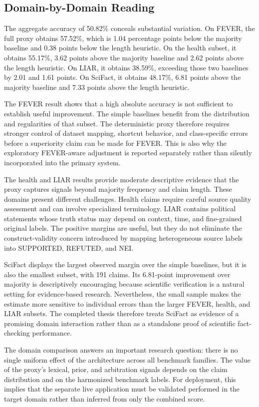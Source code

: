 \documentclass[12pt,a4paper,openany]{report}
\begin{document}
\subsection{Domain-by-Domain Reading}
The aggregate accuracy of 50.82\% conceals substantial variation. On FEVER,
the full proxy obtains 57.52\%, which is 1.04 percentage points below the
majority baseline and 0.38 points below the length heuristic. On the health
subset, it obtains 55.17\%, 3.62 points above the majority baseline and 2.62
points above the length heuristic. On LIAR, it obtains 38.59\%, exceeding
those two baselines by 2.01 and 1.61 points. On SciFact, it obtains 48.17\%,
6.81 points above the majority baseline and 7.33 points above the length
heuristic.

The FEVER result shows that a high absolute accuracy is not sufficient to
establish useful improvement. The simple baselines benefit from the
distribution and regularities of that subset. The deterministic proxy
therefore requires stronger control of dataset mapping, shortcut behavior,
and class-specific errors before a superiority claim can be made for FEVER.
This is also why the exploratory FEVER-aware adjustment is reported
separately rather than silently incorporated into the primary system.

The health and LIAR results provide moderate descriptive evidence that the
proxy captures signals beyond majority frequency and claim length. These
domains present different challenges. Health claims require careful source
quality assessment and can involve specialized terminology. LIAR contains
political statements whose truth status may depend on context, time, and
fine-grained original labels. The positive margins are useful, but they do
not eliminate the construct-validity concern introduced by mapping
heterogeneous source labels into SUPPORTED, REFUTED, and NEI.

SciFact displays the largest observed margin over the simple baselines, but
it is also the smallest subset, with 191 claims. Its 6.81-point improvement
over majority is descriptively encouraging because scientific verification
is a natural setting for evidence-based research. Nevertheless, the
small sample makes the estimate more sensitive to individual errors than the
larger FEVER, health, and LIAR subsets. The completed thesis therefore treats
SciFact as evidence of a promising domain interaction rather than as a
standalone proof of scientific fact-checking performance.

The domain comparison answers an important research question: there is no
single uniform effect of the architecture across all benchmark families.
The value of the proxy's lexical, prior, and arbitration signals depends
on the claim distribution and on the harmonized benchmark labels. For deployment, this implies that the separate live application must be validated
performed in the target domain rather than inferred from only the combined
score.
\end{document}
